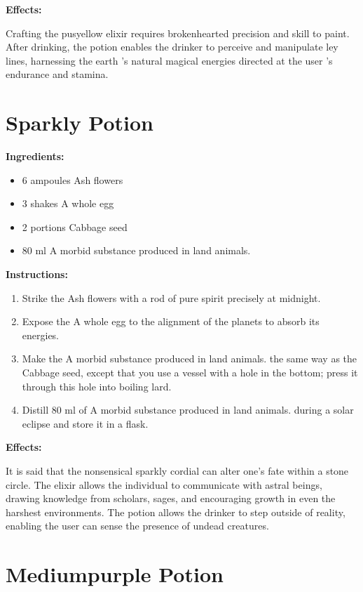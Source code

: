 \documentclass{article}
\begin{document}
\textbf{Effects:}

Crafting the pusyellow elixir requires brokenhearted precision and skill to paint. After drinking, the potion enables the drinker to perceive and manipulate ley lines, harnessing the earth 's natural magical energies directed at the user 's endurance and stamina.

\newpage
\section*{Sparkly Potion}

\textbf{Ingredients:}

\begin{itemize}
  \item 6 ampoules Ash flowers
  \item 3 shakes A whole egg
  \item 2 portions Cabbage seed
  \item 80 ml A morbid substance produced in land animals.
\end{itemize}

\textbf{Instructions:}

\begin{enumerate}
  \item Strike the Ash flowers with a rod of pure spirit precisely at midnight.
  \item Expose the A whole egg to the alignment of the planets to absorb its energies.
  \item Make the A morbid substance produced in land animals. the same way as the Cabbage seed, except that you use a vessel with a hole in the bottom; press it through this hole into boiling lard.
  \item Distill 80 ml of A morbid substance produced in land animals. during a solar eclipse and store it in a flask.
\end{enumerate}

\textbf{Effects:}

It is said that the nonsensical sparkly cordial can alter one's fate within a stone circle. The elixir allows the individual to communicate with astral beings, drawing knowledge from scholars, sages, and encouraging growth in even the harshest environments. The potion allows the drinker to step outside of reality, enabling the user can sense the presence of undead creatures.

\newpage
\section*{Mediumpurple Potion}
\end{document}
